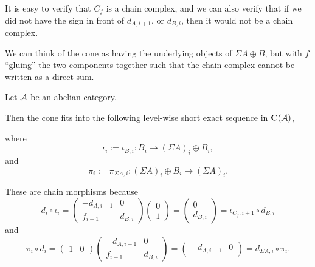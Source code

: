 It is easy to verify that \( C_f \) is a chain complex, and we can also verify that if we did not have the sign in front of \( d_{A, i + 1} \), or  \( d_{B, i} \), then it would not be a chain complex.

We can think of the cone as having the underlying objects of \( \Sigma A \oplus B \), but with \( f \) ``gluing'' the two components together such that the chain complex cannot be written as a direct sum.

\begin{remark}
    Let \( {\mathcal{A}} \) be an abelian category.

    Then the cone fits into the following level-wise short exact sequence in \( \operatorname{\mathbf{C}}({\mathcal{A}}) \),
    \begin{center}
    \end{center}
    where
    \[
        \iota_i := \iota_{B, i}: B_i \to (\Sigma A)_i \oplus B_i,
    \]
    and
    \[
        \pi_i := \pi_{\Sigma A, i}: (\Sigma A)_i \oplus B_i \to (\Sigma A)_i.
    \]

    These are chain morphisms because
    \[
        d_i \circ \iota_i =
        \begin{pmatrix}
            -d_{A, i + 1} & 0 \\
            f_{i + 1} & d_{B, i}
        \end{pmatrix}
        \begin{pmatrix}
            0 \\
            1
        \end{pmatrix}
        =
        \begin{pmatrix}
            0 \\
            d_{B, i}
        \end{pmatrix}
        =
        \iota_{C_f, i + 1} \circ d_{B, i}
    \]
    and
    \[
        \pi_i \circ d_i =
        \begin{pmatrix}
            1 & 0
        \end{pmatrix}
        \begin{pmatrix}
            -d_{A, i + 1} & 0 \\
            f_{i + 1} & d_{B, i}
        \end{pmatrix}
        =
        \begin{pmatrix}
            -d_{A, i + 1} & 0
        \end{pmatrix}
        = d_{\Sigma A, i} \circ \pi_i.
    \]
\end{remark}

